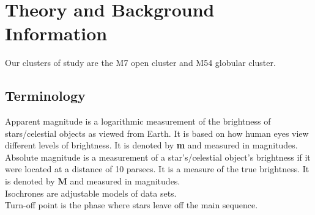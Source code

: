\documentclass[12pt]{article}
\begin{document}
	
	
	\pagebreak
	\section{Theory and Background Information}
	Our clusters of study are the M7 open cluster and M54 globular cluster.
		\subsection{Terminology}
		Apparent magnitude is a logarithmic measurement of the brightness of stars/celestial objects as viewed from Earth. It is based on how human eyes view different levels of brightness. It is denoted by \textbf{m} and measured in magnitudes.\\
		Absolute magnitude is a measurement of a star's/celestial object's brightness if it were located at a distance of 10 parsecs. It is a measure of the true brightness. It is denoted by \textbf{M} and measured in magnitudes.\\
		Isochrones are adjustable models of data  sets.\\
		Turn-off point is the phase where stars leave off the main sequence.
\end{document}
